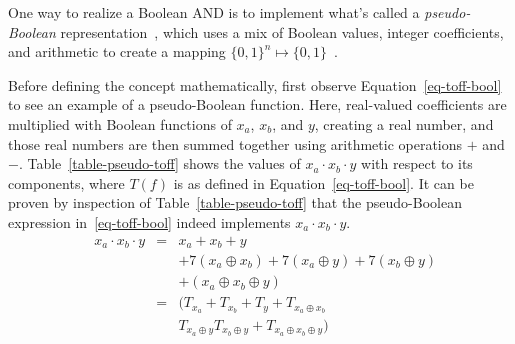 One way to realize a Boolean AND is to implement what's called a {\it pseudo-Boolean}
representation~\cite{bib-barenco-elementary,bib-amy-cnot}, which uses a mix of
Boolean values, integer coefficients, and arithmetic to create a mapping $\{0,1\}^n \mapsto \{0,1\}$~\cite{bib-amy-rm}.

Before defining the concept mathematically, first observe Equation~\ref{eq-toff-bool} to see an example of a
pseudo-Boolean function. Here, real-valued coefficients are multiplied with Boolean functions of $x_a$, $x_b$,
and $y$, creating a real number, and those real numbers are then summed together using arithmetic operations
$+$ and $-$. Table~\ref{table-pseudo-toff} shows the values of $x_a \cdot x_b \cdot y$ with respect to
its components, where $T(f)$ is as defined in Equation~\ref{eq-toff-bool}. It can be proven by inspection of
Table~\ref{table-pseudo-toff} that the pseudo-Boolean expression in~\ref{eq-toff-bool} indeed implements
$x_a \cdot x_b \cdot y$. 
\begin{equation}
  \label{eq-toff-bool}
  \begin{aligned}
    &x_a \cdot x_b \cdot y &= &x_a + x_b + y \\\nonumber
    &&&+ 7(x_a \oplus x_b) + 7(x_a \oplus y) + 7(x_b \oplus y) \\\nonumber
    &&&+ (x_a \oplus x_b \oplus y)\\\nonumber
    &&= & (T_{x_a} + T_{x_b} + T_{y} + T_{x_a \oplus x_b} \\\nonumber
    &&&T_{x_a \oplus y} T_{x_b \oplus y} + T_{x_a \oplus x_b \oplus y})
  \end{aligned}
\end{equation}
